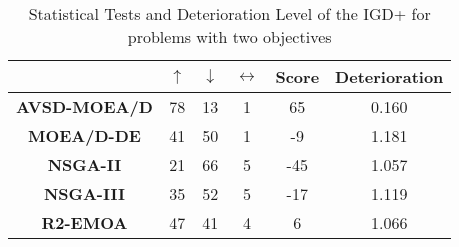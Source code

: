 
\begin{table}[t]
\centering
	\caption{Statistical Tests and Deterioration Level of the IGD+ for problems with two objectives}
\label{tab:Tests_IGDP_2obj}

\begin{scriptsize}
\begin{tabular}{c|c|c|c|c|c|}
\cline{2-6}
 & \textbf{$\uparrow$} & \textbf{$\downarrow$} & \textbf{$\leftrightarrow$} & \textbf{Score} & \textbf{Deterioration} \\ \hline
\multicolumn{1}{|c|}{\textbf{AVSD-MOEA/D}} & 78 & 13 & 1 & 65 & 0.160 \\ \hline
\multicolumn{1}{|c|}{\textbf{MOEA/D-DE}} & 41 & 50 & 1 & -9 & 1.181 \\ \hline
\multicolumn{1}{|c|}{\textbf{NSGA-II}} & 21 & 66 & 5 & -45 & 1.057 \\ \hline
\multicolumn{1}{|c|}{\textbf{NSGA-III}} & 35 & 52 & 5 & -17 & 1.119 \\ \hline
\multicolumn{1}{|c|}{\textbf{R2-EMOA}} & 47 & 41 & 4 & 6 & 1.066 \\ \hline
\end{tabular}%
\end{scriptsize}
\end{table}


